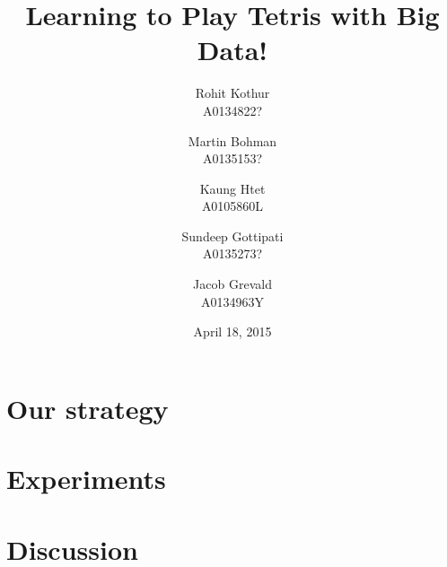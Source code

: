\documentclass[12pt,twocolumn]{article}
\title{Learning to Play Tetris with Big Data!}
\author{
	Rohit Kothur \\ A0134822? \and
	Martin Bohman \\ A0135153? \and
	Kaung Htet \\ A0105860L \and \quad
	Sundeep Gottipati \\ A0135273? \and
	Jacob Grevald \\ A0134963Y}
\date{April 18, 2015}
\begin{document}
\maketitle

\section*{Our strategy}

\section*{Experiments}

\section*{Discussion}
\end{document}
